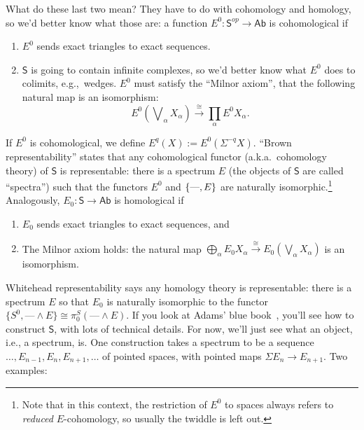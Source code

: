 \documentclass{article}
\newcommand{\sprod}{\wedge}
\newcommand{\CatOf}[1]{\mathsf{#1}}
\newcommand{\Suspend}{\Sigma}
\renewcommand{\to}{\longrightarrow}
\theoremstyle{definition}
\begin{document}
What do these last two mean?  They have to do with cohomology and homology, so we'd better know what those are: a function $E^0: \CatOf{S}^{op} \to \CatOf{Ab}$ is cohomological if
\begin{enumerate}
\item $E^0$ sends exact triangles to exact sequences.
\item $\CatOf{S}$ is going to contain infinite complexes, so we'd better know what $E^0$ does to colimits, e.g.,\ wedges. $E^0$ must satisfy the ``Milnor axiom'', that the following natural map is an isomorphism:
\[
E^0({\textstyle{\!\bigvee}_\alpha X_\alpha}) \stackrel{\cong}{\to} \prod_\alpha E^0 X_\alpha
.\]
\end{enumerate}
If $E^0$ is cohomological, we define $E^q (X) := E^0 (\Suspend^{-q} X)$. ``Brown representability'' states that any cohomological functor (a.k.a.\ cohomology theory) of $\CatOf{S}$ is representable: there is a spectrum $E$ (the objects of $\CatOf{S}$ are called ``spectra'') such that the functors $E^0$ and $\{\textup{---}, E\}$ are naturally isomorphic.\footnote{Note that in this context, the restriction of $E^0$ to spaces always refers to \emph{reduced} $E$-cohomology, so usually the twiddle is left out.}  Analogously, $E_0: \CatOf{S} \to \CatOf{Ab}$ is homological if
\begin{enumerate}
\item $E_0$ sends exact triangles to exact sequences, and
\item The Milnor axiom holds: the natural map $\bigoplus_\alpha E_0 X_\alpha \stackrel{\cong}{\to} E_0(\bigvee_\alpha X_\alpha)$ is an isomorphism.
\end{enumerate}
Whitehead representability says any homology theory is representable: there is a spectrum $E$ so that $E_0$ is naturally isomorphic to the functor $\{S^0, \text{---} \sprod E\} \cong \pi^S_0(\text{---} \sprod E)$.  If you look at Adams' blue book~\cite{Adams}, you'll see how to construct $\CatOf{S}$, with lots of technical details.  For now, we'll just see what an object, i.e., a spectrum, is.  One construction takes a spectrum to be a sequence $\ldots, E_{n-1}, E_n, E_{n+1}, \ldots$ of pointed spaces, with pointed maps $\Suspend E_n \to E_{n+1}$.  Two examples:
\end{document}
